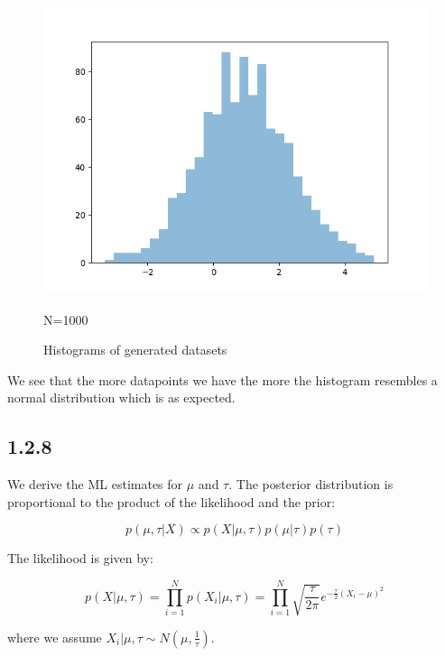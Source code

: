 \documentclass{article}
\begin{document}
\begin{multicols}{2}
\begin{figure}[H]
\begin{minipage}{0.32\textwidth}
            \includegraphics[width=\textwidth]{figures/1.2/dataset_3.png}
            \caption{N=1000}
        \end{minipage}
        \caption{Histograms of generated datasets}\label{fig:histograms_datasets}
    \end{figure}

    We see that the more datapoints we have the more the histogram resembles a normal distribution which is as expected.

    \subsection{1.2.8}

    We derive the ML estimates for $\mu$ and $\tau$. 
    The posterior distribution is proportional to the product of the likelihood and the prior:

\begin{equation}
    p(\mu, \tau | X) \propto p(X | \mu, \tau) p(\mu | \tau) p(\tau)
\end{equation}
    


    The likelihood is given by:

    \begin{equation}
    p(X | \mu, \tau) = \prod_{i=1}^{N} p(X_i | \mu, \tau) = \prod_{i=1}^{N} \sqrt{\frac{\tau}{2 \pi}} e^{-\frac{\tau}{2} (X_i - \mu)^2}
    \end{equation}

    where we assume \( X_i | \mu, \tau \sim N(\mu, \frac{1}{\tau}) \).


\end{multicols}
\end{document}
